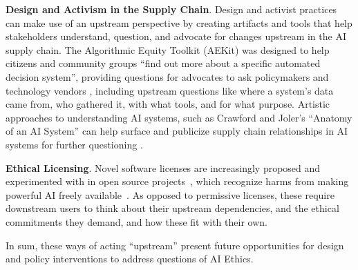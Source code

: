 \documentclass[nonacm]{acmart}
\begin{document}


\noindent\textbf{Design and Activism in the Supply Chain}. 
Design and activist practices can make use of an upstream perspective by creating artifacts and tools that help stakeholders understand, question, and advocate for changes upstream in the AI supply chain. The Algorithmic Equity Toolkit (AEKit) was designed to help citizens and community groups ``find out more about a specific automated decision system'', providing questions for advocates to ask policymakers and technology vendors \cite{Krafft2021toolkit}, including upstream questions like where a system's data came from, who gathered it, with what tools, and for what purpose. Artistic approaches to understanding AI systems, such as Crawford and Joler's ``Anatomy of an AI System'' can help surface and publicize supply chain relationships in AI systems for further questioning \cite{crawford2018anatomy}.  

\noindent\textbf{Ethical Licensing}. Novel software licenses are increasingly proposed and experimented with in open source projects~\cite{contractor2022behavioral,carlosmunozferrandis2022openrail,declaration2018montreal},  which recognize harms from making powerful AI freely available~\cite{widder2022limits}.  As opposed to permissive licenses, these require downstream users to think about their upstream dependencies, and the ethical commitments they demand, and how these fit with their own.

In sum, these ways of acting ``upstream'' present future opportunities for design and policy interventions to address questions of AI Ethics.  


\end{document}
